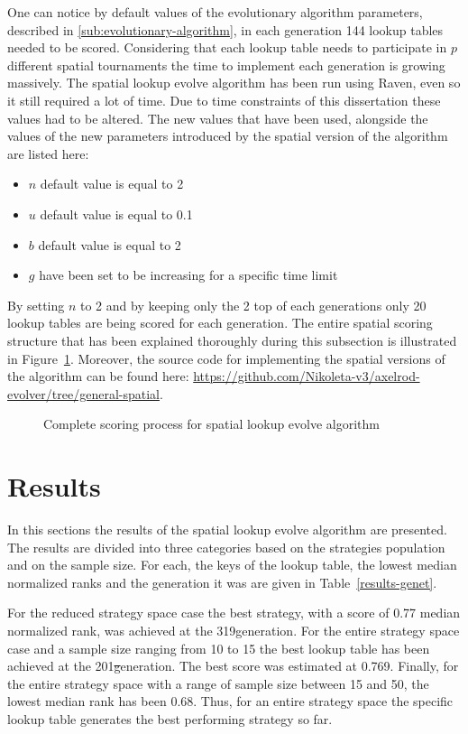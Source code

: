 One can notice by default values of the evolutionary algorithm parameters,
described in \autoref{sub:evolutionary-algorithm}, in each generation
144 lookup tables needed to be scored. Considering that each lookup table needs
to participate in \(p\) different spatial tournaments the time to implement
each generation is growing massively. The spatial lookup evolve algorithm
has been run using Raven, even so it still required a lot of time. Due to time
constraints of this dissertation these values had to be altered. The new values
that have been used, alongside the values of the new parameters introduced
by the spatial version of the algorithm are listed here:
\begin{itemize}
    \item \(n\) default value is equal to 2
    \item \(u\) default value is equal to 0.1
    \item \(b\) default value is equal to 2
    \item \(g\) have been set to be increasing for a specific time limit
\end{itemize}

By setting \(n\) to 2 and by keeping only the 2 top of each generations only
20 lookup tables are being scored for each generation. The entire spatial scoring structure that
has been explained thoroughly during this subsection is illustrated in Figure~\ref{fig:spatial-evolve}.
Moreover, the source code for implementing the spatial versions of the algorithm
can be found here: \url{https://github.com/Nikoleta-v3/axelrod-evolver/tree/general-spatial}.

\begin{figure}[H]
		
		\caption{Complete scoring process for spatial lookup evolve algorithm}
  \label{fig:spatial-evolve}
\end{figure}

\section{Results}
\label{sub:results}
In this sections the results of the spatial lookup evolve algorithm are
presented. The results are divided into three categories based on the strategies
population and on the sample size. For each, the keys of the lookup table,
the lowest median normalized ranks and the generation it was are given
in Table~\ref{results-genet}.

For the reduced strategy space case the best strategy, with a score of 0.77 median normalized
rank, was achieved at the 319\nth generation. For the entire strategy space case
and a sample size ranging from 10 to 15 the best lookup table has been achieved at
the 201\st generation. The best score was estimated at 0.769. Finally, for the
entire strategy space with a range of sample size between 15 and 50, the lowest median rank has been 0.68.
Thus, for an entire strategy space the specific lookup table generates the best performing strategy so far.

